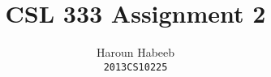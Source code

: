 \documentclass[]{article}
\begin{document}
\author{
  Haroun Habeeb\\
  \texttt{2013CS10225}
}
\title{CSL 333 Assignment 2}
\maketitle

\end{document}

